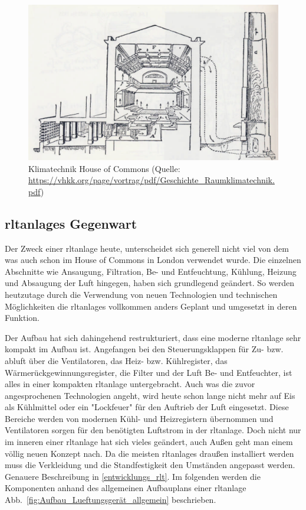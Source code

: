 \begin{figure}[ht]
	\centering
	\includegraphics[width=1\linewidth]{Bilder/Belueftung_House_of_Commons}
	\caption{Klimatechnik House of Commons  (Quelle: \url{https://vhkk.org/page/vortrag/pdf/Geschichte_Raumklimatechnik.pdf})}
	\label{fig:House_of_Commons_Klimatechnik}
\end{figure}



\subsection{\Acp{rltanlage} Gegenwart}
Der Zweck einer \ac{rltanlage} heute, unterscheidet sich generell nicht viel von dem was auch schon  im House of Commons in London verwendet wurde. Die einzelnen Abschnitte wie \zB Ansaugung, Filtration, Be- und Entfeuchtung, Kühlung, Heizung und Absaugung der Luft hingegen, haben sich grundlegend geändert. So werden heutzutage durch die Verwendung von neuen Technologien und technischen Möglichkeiten die \acp{rltanlage} vollkommen anders Geplant und umgesetzt in deren Funktion.

Der Aufbau hat sich dahingehend restrukturiert, dass eine moderne \ac{rltanlage} sehr kompakt im Aufbau ist. Angefangen bei den Steuerungsklappen für Zu- bzw. \gls{abluft} über die Ventilatoren, das Heiz- bzw. Kühlregister, das Wärmerückgewinnungsregister, die Filter und der Luft Be- und Entfeuchter, ist alles in einer kompakten \ac{rltanlage} untergebracht. Auch was die zuvor angesprochenen Technologien angeht, wird heute schon lange nicht mehr auf Eis als Kühlmittel oder ein "Lockfeuer" für den Auftrieb der Luft eingesetzt. Diese Bereiche werden \zB von modernen Kühl- und Heizregistern übernommen und Ventilatoren sorgen für den benötigten Luftstrom in der \ac{rltanlage}. Doch nicht nur im inneren einer \ac{rltanlage} hat sich vieles geändert, auch Außen geht man einem völlig neuen Konzept nach. Da die meisten \acp{rltanlage} draußen installiert werden muss die Verkleidung und die Standfestigkeit den Umständen angepasst werden. Genauere Beschreibung in \ref{entwicklungs_rlt}.
Im folgenden werden die Komponenten anhand des allgemeinen Aufbauplans einer \ac{rltanlage} Abb.~\ref{fig:Aufbau_Lueftungsgerät_allgemein} beschrieben. 

